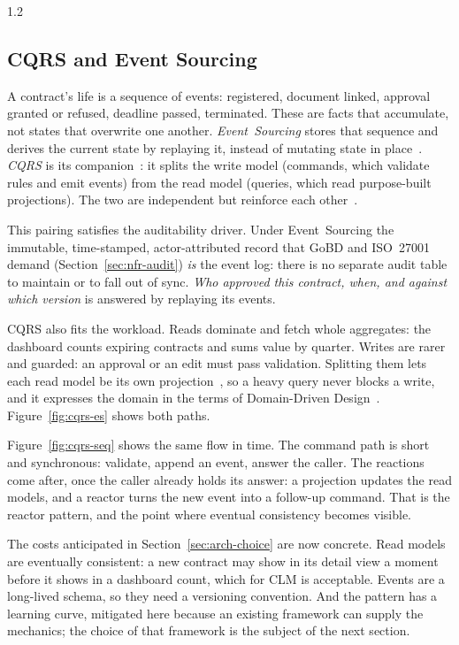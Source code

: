 \begin{spacing}{1.2}
\subsection{CQRS and Event Sourcing}
\label{sec:cqrs-es-pattern}

A contract's life is a sequence of events: registered, document linked,
approval granted or refused, deadline passed, terminated. These are facts
that accumulate, not states that overwrite one another.
\textit{Event~Sourcing} stores that sequence and derives the current state
by replaying it, instead of mutating state in
place~\cite{FowlerEventSourcing,Young2010}. \textit{CQRS} is its
companion~\cite{FowlerCQRS,Young2010}: it splits the write model (commands,
which validate rules and emit events) from the read model (queries, which
read purpose-built projections). The two are independent but reinforce each
other~\cite{MicrosoftCQRS,MicrosoftEventSourcing}.

This pairing satisfies the auditability driver. Under
Event~Sourcing the immutable, time-stamped, actor-attributed record that
GoBD and ISO~27001 demand (Section~\ref{sec:nfr-audit}) \emph{is} the event
log: there is no separate audit table to maintain or to fall out of sync.
\textit{Who approved this contract, when, and against which version} is
answered by replaying its events.

CQRS also fits the workload. Reads dominate and fetch whole aggregates: the
dashboard counts expiring contracts and sums value by quarter. Writes are
rarer and guarded: an approval or an edit must pass validation. Splitting
them lets each read model be its own projection~\cite{Fowler2003}, so a
heavy query never blocks a write, and it expresses the domain in the terms
of Domain-Driven Design~\cite{Evans2003,Vernon2013}.
Figure~\ref{fig:cqrs-es} shows both paths.


Figure~\ref{fig:cqrs-seq} shows the same flow in time. The command path
is short and synchronous: validate, append an event, answer the caller.
The reactions come after, once the caller already holds its answer: a
projection updates the read models, and a reactor turns the new event
into a follow-up command. That is the reactor pattern, and the point
where eventual consistency becomes visible.


The costs anticipated in Section~\ref{sec:arch-choice} are now concrete.
Read models are eventually consistent: a new contract
may show in its detail view a moment before it shows in a dashboard count,
which for CLM is acceptable. Events are a long-lived schema, so they need a
versioning convention. And the pattern has a learning curve, mitigated
here because an existing framework can supply the mechanics; the choice of
that framework is the subject of the next section.
\vspace{1cm}



\end{spacing}
